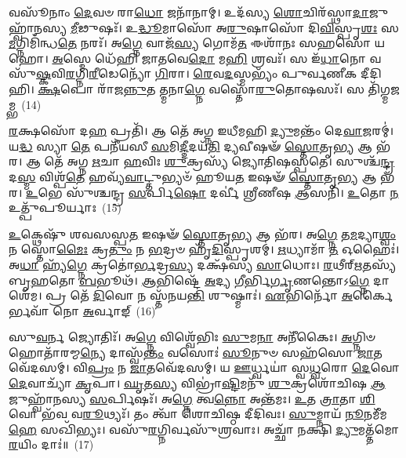 𑌵𑌸𑍂᳴𑌨𑌾𑌂 \ul{𑌦𑍇}\-𑌵𑍞 𑌰𑌾\-\ul{𑌧𑍋} 𑌜𑌨𑌾᳴𑌨𑌾𑌮𑍍। 𑌉𑌦᳴𑌸𑍍𑌯 \ul{𑌶𑍋}\-𑌚𑌿𑌰᳴𑌸𑍍𑌥𑌾\-\ul{𑌦𑌾}\-𑌜𑍁𑌹𑍍𑌵𑌾᳴𑌨𑌸𑍍𑌯 \ul{𑌮𑍀}\-𑌢𑍁𑌷𑌃᳴। 𑌉\-\ul{𑌦𑍍𑌧𑍂}\-𑌮𑌾𑌸𑍋᳴ 𑌅\-\ul{𑌰𑍁}\-𑌷𑌾𑌸𑍋᳴ 𑌦𑌿\-\ul{𑌵𑌿}\-𑌸𑍍𑌪𑍃\-\ul{𑌶𑌃} 𑌸\-\ul{𑌮}\-𑌗𑍍𑌨𑌿𑌮𑌿᳴𑌨𑍍𑌧\-\ul{𑌤𑍇} 𑌨𑌰𑌃᳴। 𑌅\-\ul{𑌗𑍍𑌨𑍇} 𑌵𑌾𑌜᳴\-\ul{𑌸𑍍𑌯} 𑌗𑍋𑌮᳴\-\ul{𑌤} 𑌈𑌶𑌾᳴𑌨𑌃 𑌸𑌹𑌸𑍋 𑌯𑌹𑍋। \ul{𑌅}\-𑌸𑍍𑌮𑍇 𑌧𑍇᳴𑌹𑌿 𑌜𑌾𑌤𑌵𑍇\-\ul{𑌦𑍋} 𑌮\-\ul{𑌹𑌿} 𑌶𑍍𑌰𑌵𑌃᳴। 𑌸 𑌇᳴\-\ul{𑌧𑌾}\-𑌨𑍋 𑌵𑌸𑍁᳴\-\ul{𑌷𑍍𑌕}\-𑌵𑌿\-\ul{𑌰}\-𑌗𑍍𑌨𑌿\-\ul{𑌰𑍀}\-𑌡𑍇𑌨𑍍𑌯𑍋᳴ \ul{𑌗𑌿}\-𑌰𑌾। \ul{𑌰𑍇}\-𑌵\-\ul{𑌦}\-𑌸𑍍𑌮𑌭𑍍𑌯𑌂᳴ 𑌪𑍁𑌰𑍍𑌵𑌣𑍀𑌕 𑌦𑍀𑌦𑌿𑌹𑌿। \ul{𑌕𑍍𑌷}\-𑌪𑍋 𑌰𑌾᳴𑌜\-\ul{𑌨𑍍𑌨𑍁}\-𑌤 𑌤𑍍𑌮𑌨𑌾\-\ul{𑌗𑍍𑌨𑍇} 𑌵𑌸𑍍𑌤𑍋᳴\-\ul{𑌰𑍁}\-𑌤𑍋𑌷𑌸𑌃᳴। 𑌸 𑌤𑌿᳴𑌗𑍍𑌮𑌜𑌮𑍍𑌭~(14)

\-\ul{𑌰}\-𑌕𑍍𑌷𑌸𑍋᳴ 𑌦\-\ul{𑌹} 𑌪𑍍𑌰𑌤𑌿᳴। 𑌆 𑌤𑍇᳴ 𑌅𑌗𑍍𑌨 𑌇𑌧𑍀𑌮𑌹𑌿 \ul{𑌦𑍍𑌯𑍁}\-𑌮𑌨𑍍𑌤𑌂᳴ 𑌦𑍇\-\ul{𑌵𑌾}\-𑌜𑌰𑌮𑍍॑। 𑌯\-\ul{𑌦𑍍𑌧} 𑌸𑍍𑌯𑌾 \ul{𑌤𑍇} 𑌪𑌨𑍀᳴𑌯𑌸𑍀 \ul{𑌸}\-𑌮𑌿\-\ul{𑌦𑍍𑌦𑍀}\-𑌦𑌯᳴\-\ul{𑌤𑌿} 𑌦𑍍𑌯𑌵𑍀𑌷𑍟᳴ \ul{𑌸𑍍𑌤𑍋}\-𑌤𑍃\-\ul{𑌭𑍍𑌯} 𑌆 𑌭᳴𑌰। 𑌆 𑌤𑍇᳴ 𑌅𑌗𑍍𑌨 \ul{𑌋}\-𑌚𑌾 \ul{𑌹}\-𑌵𑌿𑌃 \ul{𑌶𑍁}\-𑌕𑍍𑌰𑌸𑍍𑌯᳴ 𑌜𑍍𑌯𑍋𑌤𑌿𑌷𑌸𑍍𑌪𑌤𑍇। 𑌸𑍁𑌶𑍍𑌚᳴\-\ul{𑌨𑍍𑌦𑍍𑌰} 𑌦\-\ul{𑌸𑍍𑌮} 𑌵𑌿𑌶𑍍𑌪᳴\-\ul{𑌤𑍇} 𑌹𑌵𑍍𑌯᳴\-\ul{𑌵𑌾}\-𑌟𑍍𑌤𑍁𑌭𑍍𑌯𑍞᳴ 𑌹𑍂𑌯\-\ul{𑌤} 𑌇𑌷𑍟᳴ \ul{𑌸𑍍𑌤𑍋}\-𑌤𑍃\-\ul{𑌭𑍍𑌯} 𑌆 𑌭᳴𑌰। \ul{𑌉}\-𑌭𑍇 𑌸𑍁᳴𑌶𑍍𑌚𑌨𑍍𑌦𑍍𑌰 \ul{𑌸}\-𑌰𑍍𑌪𑌿\-\ul{𑌷𑍋} 𑌦𑌰𑍍𑌵𑍀॑ 𑌶𑍍𑌰𑍀𑌣𑍀𑌷 \ul{𑌆}\-𑌸𑌨𑌿᳴। \ul{𑌉}\-𑌤𑍋 \ul{𑌨} 𑌉𑌤𑍍𑌪𑍁᳴𑌪𑍂𑌰𑍍𑌯𑌾𑌃~(15)

\-\ul{𑌉}\-𑌕𑍍𑌥𑍇𑌷𑍁᳴ 𑌶𑌵𑌸𑌸𑍍𑌪\-\ul{𑌤} 𑌇𑌷𑍟᳴ \ul{𑌸𑍍𑌤𑍋}\-𑌤𑍃\-\ul{𑌭𑍍𑌯} 𑌆 𑌭᳴𑌰। 𑌅\-\ul{𑌗𑍍𑌨𑍇} 𑌤\-\ul{𑌮}\-𑌦𑍍𑌯𑌾\-\ul{𑌶𑍍𑌵𑌂} 𑌨 𑌸𑍍𑌤𑍋\-\ul{𑌮𑍈𑌃} 𑌕𑍍𑌰\-\ul{𑌤𑍁𑌂} 𑌨 \ul{𑌭}\-𑌦𑍍𑌰𑍞 𑌹𑍃᳴\-\ul{𑌦𑌿}\-𑌸𑍍𑌪𑍃𑌶𑌮𑍍॑। \ul{𑌋}\-𑌧𑍍𑌯𑌾𑌮𑌾᳴ \ul{𑌤} 𑌓𑌹𑍈𑌃॑। 𑌅\-\ul{𑌧𑌾} 𑌹𑍍𑌯᳴\-\ul{𑌗𑍍𑌨𑍇} 𑌕𑍍𑌰𑌤𑍋॑\-\ul{𑌰𑍍𑌭}\-𑌦𑍍𑌰\-\ul{𑌸𑍍𑌯} 𑌦𑌕𑍍𑌷᳴𑌸𑍍𑌯 \ul{𑌸𑌾}\-𑌧𑍋𑌃। \ul{𑌰}\-𑌥𑍀𑌰𑍍\mbox{}\-\ul{𑌋}\-𑌤𑌸𑍍𑌯᳴ 𑌬𑍃\-\ul{𑌹}\-𑌤𑍋 \ul{𑌬}\-𑌭𑍂𑌥᳴। \ul{𑌆}\-𑌭𑌿𑌷𑍍𑌟𑍇᳴ \ul{𑌅}\-𑌦𑍍𑌯 \ul{𑌗𑍀}\-𑌰𑍍𑌭𑌿\-\ul{𑌰𑍍𑌗𑍃}\-𑌣𑌨𑍍𑌤𑍋\-𑌽\-\ul{𑌗𑍍𑌨𑍇} 𑌦𑌾𑌶𑍇᳴𑌮। 𑌪𑍍𑌰 𑌤𑍇᳴ \ul{𑌦𑌿}\-𑌵𑍋 𑌨 𑌸𑍍𑌤᳴𑌨𑌯\-\ul{𑌨𑍍𑌤𑌿} 𑌶𑍁𑌷𑍍𑌮𑌾𑌃॑। \ul{𑌏}\-𑌭𑌿𑌰𑍍𑌨𑍋᳴ \ul{𑌅}\-𑌰𑍍𑌕𑍈𑌰𑍍𑌭𑌵𑌾᳴ 𑌨𑍋 \ul{𑌅}\-𑌰𑍍𑌵𑌾𑌙𑍍~(16)

𑌸𑍁\-\ul{𑌵}\-𑌰𑍍𑌨 𑌜𑍍𑌯𑍋𑌤𑌿𑌃᳴। 𑌅\-\ul{𑌗𑍍𑌨𑍇} 𑌵𑌿𑌶𑍍𑌵𑍇᳴𑌭𑌿𑌃 \ul{𑌸𑍁}\-𑌮\-\ul{𑌨𑌾} 𑌅𑌨𑍀᳴𑌕𑍈𑌃। \ul{𑌅}\-𑌗𑍍𑌨𑌿𑍞 𑌹𑍋𑌤𑌾᳴𑌰𑌮𑍍𑌮\-\ul{𑌨𑍍𑌯𑍇} 𑌦𑌾𑌸𑍍𑌵᳴\-\ul{𑌨𑍍𑌤𑌂} 𑌵𑌸𑍋𑌃॑ \ul{𑌸𑍂}\-𑌨𑍁𑍞 𑌸𑌹᳴𑌸𑍋 \ul{𑌜𑌾}\-𑌤𑌵𑍇᳴𑌦𑌸𑌮𑍍। 𑌵𑌿\-\ul{𑌪𑍍𑌰𑌂} 𑌨 \ul{𑌜𑌾}\-𑌤𑌵𑍇᳴𑌦𑌸𑌮𑍍। 𑌯 \ul{𑌊}\-𑌰𑍍𑌧𑍍𑌵𑌯𑌾॑ 𑌸𑍍𑌵\-\ul{𑌧𑍍𑌵}\-𑌰𑍋 \ul{𑌦𑍇}\-𑌵𑍋 \ul{𑌦𑍇}\-𑌵𑌾𑌚𑍍𑌯𑌾᳴ \ul{𑌕𑍃}\-𑌪𑌾। \ul{𑌘𑍃}\-𑌤\-\ul{𑌸𑍍𑌯} 𑌵𑌿𑌭𑍍𑌰𑌾॑\-\ul{𑌷𑍍𑌟𑌿}\-𑌮𑌨𑍁᳴ \ul{𑌶𑍁}\-𑌕𑍍𑌰𑌶𑍋᳴𑌚𑌿𑌷 \ul{𑌆}\-𑌜𑍁𑌹𑍍𑌵𑌾᳴𑌨𑌸𑍍𑌯 \ul{𑌸}\-𑌰𑍍𑌪𑌿𑌷𑌃᳴। 𑌅\-\ul{𑌗𑍍𑌨𑍇} 𑌤𑍍𑌵\-\ul{𑌨𑍍𑌨𑍋} 𑌅𑌨𑍍𑌤᳴𑌮𑌃। \ul{𑌉}\-𑌤 \ul{𑌤𑍍𑌰𑌾}\-𑌤𑌾 \ul{𑌶𑌿}\-𑌵𑍋 𑌭᳴𑌵 𑌵\-\ul{𑌰𑍂}\-𑌥𑍍𑌯𑌃᳴। 𑌤𑌂 𑌤𑍍𑌵𑌾᳴ 𑌶𑍋𑌚𑌿𑌷𑍍𑌠 𑌦𑍀𑌦𑌿𑌵𑌃। \ul{𑌸𑍁}\-𑌮𑍍𑌨𑌾𑌯᳴ \ul{𑌨𑍂}\-𑌨𑌮𑍀᳴𑌮\-\ul{𑌹𑍇} 𑌸𑌖𑌿᳴𑌭𑍍𑌯𑌃। 𑌵𑌸𑍁᳴\-\ul{𑌰}\-𑌗𑍍𑌨𑌿𑌰𑍍𑌵𑌸𑍁᳴𑌶𑍍𑌰𑌵𑌾𑌃। 𑌅𑌚𑍍𑌛𑌾᳴ 𑌨𑌕𑍍𑌷𑌿 \ul{𑌦𑍍𑌯𑍁}\-𑌮𑌤𑍍𑌤᳴𑌮𑍋 \ul{𑌰}\-𑌯𑌿𑌂 𑌦𑌾𑌃॑॥~(17)

{}%

